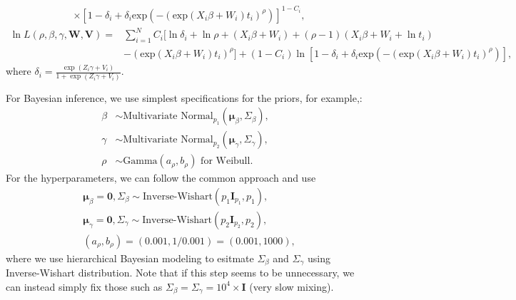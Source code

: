 \documentclass[a4paper, 12pt]{article}
\newcommand {\dsum}{\displaystyle \sum}
\begin{document}
\begin{itemize}
\begin{equation}
\begin{aligned}
	&\times [1-\delta _{i}+\delta_i \mbox{exp}(-(\mbox{exp}(X_i{\beta}+W_i)t_i)^{\rho})]^{1-C_{i}},
	\end{aligned}
	\end{equation}
	\begin{equation}
	\begin{aligned}
	\ln L(\rho, {\beta}, {\gamma}, \mathbf{W}, \mathbf{V})=&\dsum\limits_{i=1}^{N}C_i [\ln\delta _{i}+ \ln\rho+(X_i{\beta}+ W_i) + (\rho-1)(X_i{\beta}+ W_i+ \ln t_i)\\&-(\mbox{exp}(X_i{\beta}+W_i)t_i)^{\rho}]+(1-C_i)\ln[1-\delta _{i}+\delta_i \mbox{exp}(-(\mbox{exp}(X_i{\beta}+W_i)t_i)^{\rho})],		
	\end{aligned}
	\end{equation}
	where $\delta_i =\frac{\exp ({Z}_i{\gamma} + V_i)}{1+\exp ({Z}_i{\gamma}+V_i)}$.
\end{itemize}
For Bayesian inference, we use simplest specifications for the priors, for example,:
\begin{equation}
\begin{aligned}
{\beta} &\sim \mbox{Multivariate Normal}_{p_1}(\mathbf{\mu}_{\beta}, \Sigma_{\beta}),\\
{\gamma} &\sim \mbox{Multivariate Normal}_{p_2}(\mathbf{\mu}_{\gamma}, \Sigma_{\gamma}),\\
\rho&\sim \mbox{Gamma}(a_{\rho}, b_{\rho}) \mbox{ for Weibull}.
\end{aligned}
\end{equation}
For the hyperparameters, we can follow the common approach and use
\begin{equation}
\begin{aligned}
&\mathbf{\mu}_{\beta} = \mathbf{0}, \Sigma_{\beta} \sim \mbox{Inverse-Wishart}(p_1\mathbf{I}_{p_1}, p_1),\\
& \mathbf{\mu}_{\gamma} = \mathbf{0}, \Sigma_{\gamma} \sim \mbox{Inverse-Wishart}(p_2\mathbf{I}_{p_2}, p_2), \\
& (a_{\rho}, b_{\rho}) = (0.001, 1/0.001)= (0.001, 1000),
\end{aligned}
\end{equation}
where we use hierarchical Bayesian modeling to esitmate $\Sigma_{\beta}$ and $\Sigma_{\gamma}$ using Inverse-Wishart distribution. Note that if this step seems to be unnecessary, we can instead simply fix those such as $\Sigma_{\beta} =\Sigma_{\gamma} = 10^4\times\mathbf{I}$ (very slow mixing). 
\end{document}
